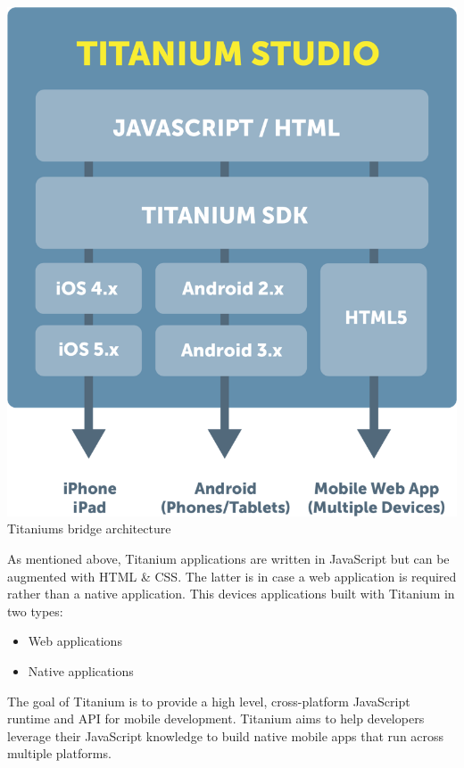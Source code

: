 \begin{centering}
	\includegraphics[scale=0.4]{images/titanium_architecture.png}\\{Titaniums bridge architecture\cite{Inc2012a}}\\
\end{centering}

As mentioned above, Titanium applications are written in JavaScript but can be augmented with HTML \& CSS. The latter is in case a web application is required rather than a native application. This devices applications built with Titanium in two types:
\begin{itemize}
	\item
	Web applications
	\item
	Native applications
\end{itemize}

The goal of Titanium is to provide a high level, cross-platform JavaScript runtime and API for mobile development.\cite{Whinnery2012} Titanium aims to help developers leverage their JavaScript knowledge to build native mobile apps that run across multiple platforms.

